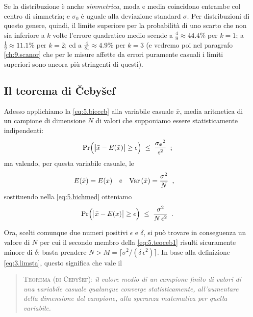 Se la distribuzione \`e anche \emph{simmetrica}, moda e
media coincidono entrambe col centro di simmetria; e
$\sigma_0$ \`e uguale alla deviazione standard $\sigma$.
Per distribuzioni di questo genere, quindi, il limite
superiore per la probabilit\`a di uno scarto che non sia
inferiore a $k$ volte l'errore quadratico medio scende a
$\frac{4}{9} \approx 44.4\%$ per $k=1$; a $\frac{1}{9}
\approx 11.1\%$ per $k=2$; ed a $\frac{4}{81} \approx 4.9\%$
per $k=3$ (e vedremo poi nel paragrafo \ref{ch:9.scanor} che
per le misure affette da errori puramente casuali i limiti
superiori sono ancora pi\`u stringenti di questi).

\subsection{Il teorema di \v Ceby\v sef}%
Adesso applichiamo la \eqref{eq:5.bieceb} alla variabile
casuale $\bar x$, media aritmetica di un campione di
dimensione $N$ di valori che supponiamo essere
statisticamente indipendenti:
\begin{equation} \label{eq:5.bichmed}
  \Pr \Bigl( \bigl| \bar x - E( \bar x ) \bigr| \geq
  \epsilon \Bigr) \; \leq \; \frac{ {\sigma_{\bar x}}^2 }{
    \epsilon^2 } \;\; ;
\end{equation}
ma valendo, per questa variabile casuale, le
\begin{align*}
  E(\bar x) &= E(x) & &\text{e} & \operatorname{Var} \left( \bar x
  \right) &= \frac{\sigma^2}{N} \;\; ,
\end{align*}
sostituendo nella \eqref{eq:5.bichmed} otteniamo
\begin{equation} \label{eq:5.teoceb1}
  \Pr \Bigl( \bigl| \bar x - E(x) \bigr| \geq \epsilon
  \Bigr) \; \leq \; \frac{\sigma^2}{N \, \epsilon^2} \;\; .
\end{equation}

Ora, scelti comunque due numeri positivi $\epsilon$ e
$\delta$, si pu\`o trovare in conseguenza un valore di $N$
per cui il secondo membro della \eqref{eq:5.teoceb1} risulti
sicuramente minore di $\delta$: basta prendere $N > M =
\lceil \sigma^2/(\delta \, \epsilon^2) \rceil $.  In base
alla definizione \eqref{eq:3.limsta}, questo significa che
vale il
\begin{quote}
  \textsc{Teorema (di \v Ceby\v sef):}
  \label{th:5.teoceb}
  \textit{il valore medio di un campione finito di valori di
    una variabile casuale qualunque converge
    statisticamente, all'aumentare della dimensione del
    campione, alla speranza matematica per quella
    variabile.}
\end{quote}%


